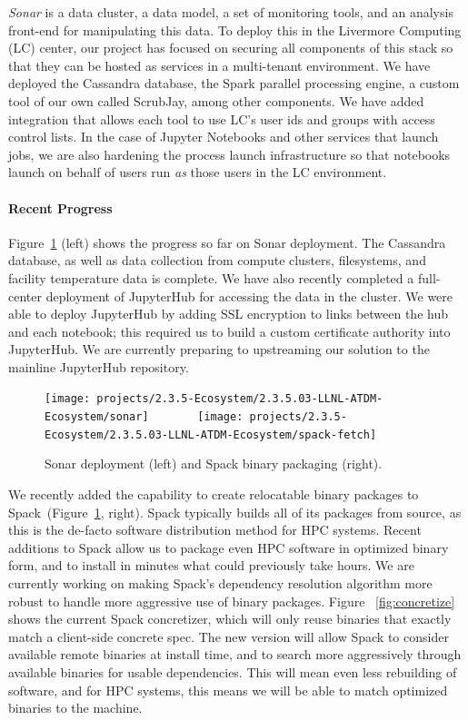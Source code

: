 {\it Sonar} is a data cluster, a data model, a set of monitoring tools,
and an analysis front-end for manipulating this data. To deploy this in
the Livermore Computing (LC) center, our project has focused on securing
all components of this stack so that they can be hosted as services in a
multi-tenant environment. We have deployed the Cassandra database, the
Spark parallel processing engine, a custom tool of our own called
ScrubJay, among other components. We have added integration that allows
each tool to use LC's user ids and groups with access control lists. In
the case of Jupyter Notebooks and other services that launch jobs, we are
also hardening the process launch infrastructure so that notebooks launch
on behalf of users run {\it as} those users in the LC environment.

\paragraph{Recent Progress}
Figure~\ref{fig:sonar-spack} (left) shows the progress so far on Sonar
deployment.  The Cassandra database, as well as data collection from
compute clusters, filesystems, and facility temperature data is complete.
We have also recently completed a full-center deployment of JupyterHub
for accessing the data in the cluster. We were able to deploy JupyterHub
by adding SSL encryption to links between the hub and each notebook; this
required us to build a custom certificate authority into JupyterHub.  We
are currently preparing to upstreaming our solution to the mainline
JupyterHub repository.
\begin{figure}[htb]
    \centering
    \texttt{[image: projects/2.3.5-Ecosystem/2.3.5.03-LLNL-ATDM-Ecosystem/sonar]}~~~~~~~
    \texttt{[image: projects/2.3.5-Ecosystem/2.3.5.03-LLNL-ATDM-Ecosystem/spack-fetch]}
    \caption{
        \label{fig:sonar-spack} Sonar deployment (left) and
        Spack binary packaging (right).
    }
\end{figure}

We recently added the capability to create relocatable binary packages to
Spack~(Figure~\ref{fig:sonar-spack}, right).  Spack typically builds all
of its packages from source, as this is the de-facto software
distribution method for HPC systems. Recent additions to Spack allow us
to package even HPC software in optimized binary form, and to install in
minutes what could previously take hours. We are currently working on
making Spack's dependency resolution algorithm more robust to handle more
aggressive use of binary packages. Figure ~\ref{fig:concretize} shows the
current Spack concretizer, which will only reuse binaries that exactly
match a client-side concrete spec. The new version will allow Spack to
consider available remote binaries at install time, and to search more
aggressively through available binaries for usable dependencies. This
will mean even less rebuilding of software, and for HPC systems, this
means we will be able to match optimized binaries to the machine.

